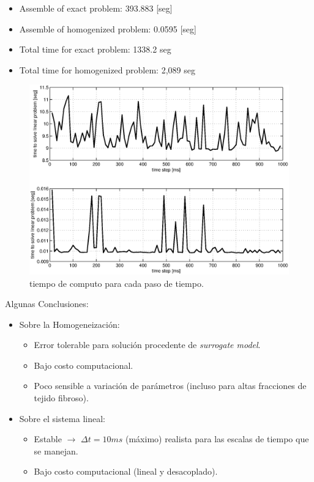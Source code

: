\documentclass[11pt,spanish]{beamer}
\begin{document}
\begin{frame}
\begin{itemize}
\item Assemble of exact problem: 393.883 [seg]
\item Assemble of homogenized problem: 0.0595 [seg]
\item Total time for exact problem: 1338.2 seg
\item Total time for homogenized problem: 2,089 seg
\end{itemize}
\begin{figure}[H]
\centering
\includegraphics[height = 5 cm]{fig/numerical_example_MDE_exp3_benchmark}
\caption{tiempo de computo para cada paso de tiempo.}
\end{figure}
\end{frame}

\begin{frame}
Algunas Conclusiones:

\begin{itemize}
\item Sobre la Homogeneización:
\begin{itemize}
\item Error tolerable para solución procedente de \textsl{surrogate model}. \pause
\item Bajo costo computacional. \pause
\item Poco sensible a variación de parámetros (incluso para altas fracciones de tejido fibroso). \pause
\end{itemize}
\item Sobre el sistema lineal:
\begin{itemize}
\item Estable \pause $\rightarrow$ $\Delta t = 10 ms$ (máximo) realista para las escalas de tiempo que se manejan.
\item Bajo costo computacional (lineal y desacoplado).
\end{itemize}
\end{itemize}
\end{frame}
\end{document}
